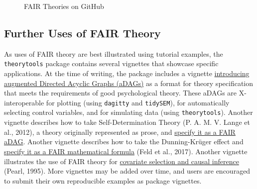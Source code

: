 \documentclass[
  man, noextraspace,floatsintext]{apa7}
\begin{document}
\begin{figure}
\caption{FAIR Theories on GitHub}\label{fig:figgithub}
\end{figure}

\subsection{Further Uses of FAIR Theory}\label{further-uses-of-fair-theory}

As uses of FAIR theory are best illustrated using tutorial examples,
the \texttt{theorytools} package contains several vignettes that showcase specific applications.
At the time of writing, the package includes a
vignette \href{https://cjvanlissa.github.io/theorytools/articles/augmented_dags.html}{introducing augmented Directed Acyclic Graphs (aDAGs)} as a format for theory specification that meets the requirements of good psychological theory.
These aDAGs are X-interoperable for plotting (using \texttt{dagitty} and \texttt{tidySEM}),
for automatically selecting control variables, and for simulating data (using \texttt{theorytools}).
Another vignette describes how to take Self-Determination Theory (P. A. M. V. Lange et al., 2012), a theory originally represented as prose, and \href{https://cjvanlissa.github.io/theorytools/articles/formalizing_sdt.html}{specify it as a FAIR aDAG}.
Another vignette describes how to take the Dunning-Krüger effect and \href{https://cjvanlissa.github.io/theorytools/articles/dunning-kruger.html}{specify it as a FAIR mathematical formula} (Feld et al., 2017).
Another vignette illustrates the use of FAIR theory for \href{https://cjvanlissa.github.io/theorytools/articles/causal-inference.html}{covariate selection and causal inference} (Pearl, 1995).
More vignettes may be added over time, and users are encouraged to submit their own reproducible examples as package vignettes.
\end{document}
